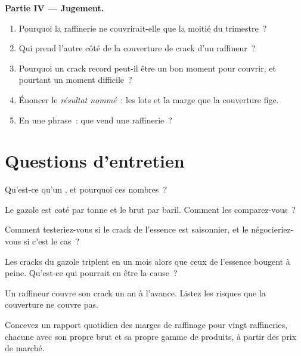 \begin{problem}
\medskip\noindent\textbf{Partie IV --- Jugement.}
\begin{enumerate}[resume]
\item Pourquoi la raffinerie ne couvrirait-elle que la moitié du trimestre~?
\item Qui prend l'autre côté de la couverture de crack d'un raffineur~?
\item Pourquoi un crack record peut-il être un bon moment pour couvrir, et pourtant un moment difficile~?
\item Énoncer le \emph{résultat nommé}~: les lots et la marge que la couverture fige.
\item En une phrase~: que vend une raffinerie~?
\end{enumerate}
\end{problem}

\section{Questions d'entretien}

\begin{interviewq}\label{iq:m3:refined-products-and-cracks:1}
Qu'est-ce qu'un , et pourquoi ces nombres~?
\end{interviewq}

\begin{interviewq}\label{iq:m3:refined-products-and-cracks:2}
Le gazole est coté par tonne et le brut par baril. Comment les comparez-vous~?
\end{interviewq}

\begin{interviewq}\label{iq:m3:refined-products-and-cracks:3}
Comment testeriez-vous si le crack de l'essence est saisonnier, et le négocieriez-vous si c'est le cas~?
\end{interviewq}

\begin{interviewq}\label{iq:m3:refined-products-and-cracks:4}
Les cracks du gazole triplent en un mois alors que ceux de l'essence bougent à peine. Qu'est-ce qui pourrait en être la cause~?
\end{interviewq}

\begin{interviewq}\label{iq:m3:refined-products-and-cracks:5}
Un raffineur couvre son crack un an à l'avance. Listez les risques que la couverture ne couvre pas.
\end{interviewq}

\begin{interviewq}\label{iq:m3:refined-products-and-cracks:6}
Concevez un rapport quotidien des marges de raffinage pour vingt raffineries, chacune
avec son propre brut et sa propre gamme de produits, à partir des prix de marché.
\end{interviewq}
